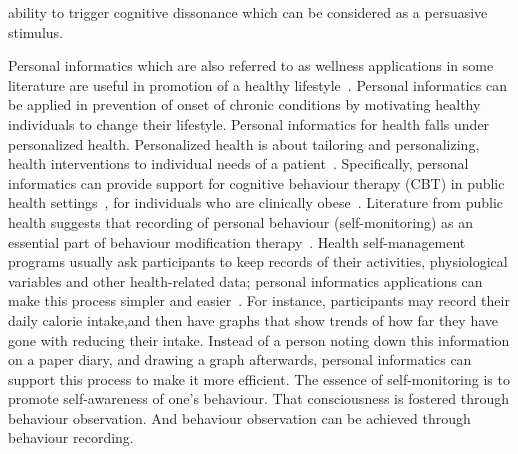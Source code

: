 ability to trigger cognitive dissonance which can be considered as a persuasive stimulus. 

Personal informatics which are also referred to as wellness applications in some literature are useful in promotion of a healthy lifestyle~\citep{korhonen2010personal}. Personal informatics can be applied in prevention of onset of chronic conditions by motivating healthy individuals to change their lifestyle. Personal informatics for health falls under personalized health. Personalized health is about tailoring and personalizing, health interventions to individual needs of a patient~\citep{mccallum2012gamification}. Specifically, personal informatics can provide support for cognitive behaviour therapy (CBT) in public health settings~\citep{mattila2008mobile}, for individuals who are clinically obese~\citep{nih2000practical}. Literature from public health suggests that recording of personal behaviour (self-monitoring) as an essential part of behaviour modification therapy~\citep{nih2000practical}. Health self-management programs usually ask participants to keep records of their activities, physiological variables and other health-related data; personal informatics applications can make this process simpler and easier~\citep{medynskiy2010salud}. For instance, participants may record their daily calorie intake,and then have graphs that show trends of how far they have gone with reducing their intake. Instead of a person noting down this information on a paper diary, and drawing a graph afterwards, personal informatics can support this process to make it more efficient. The essence of self-monitoring is to promote self-awareness of one’s behaviour. That consciousness is fostered through behaviour observation. And behaviour observation can be achieved through behaviour recording.  

